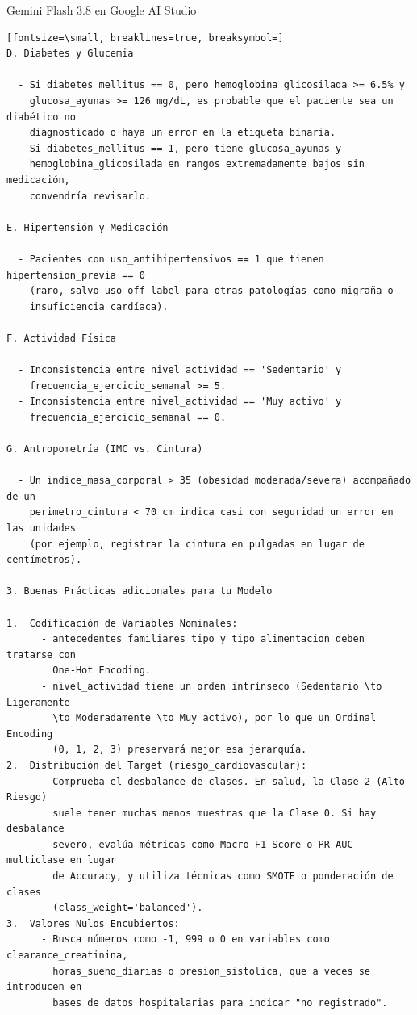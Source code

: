 \documentclass[12pt,a4paper,oneside]{book}
\begin{document}
\begin{iaresp}{Gemini Flash 3.8 en Google AI Studio}
\begin{Verbatim}[fontsize=\small, breaklines=true, breaksymbol=]
D. Diabetes y Glucemia

  - Si diabetes_mellitus == 0, pero hemoglobina_glicosilada >= 6.5% y
    glucosa_ayunas >= 126 mg/dL, es probable que el paciente sea un diabético no
    diagnosticado o haya un error en la etiqueta binaria.
  - Si diabetes_mellitus == 1, pero tiene glucosa_ayunas y
    hemoglobina_glicosilada en rangos extremadamente bajos sin medicación,
    convendría revisarlo.

E. Hipertensión y Medicación

  - Pacientes con uso_antihipertensivos == 1 que tienen hipertension_previa == 0
    (raro, salvo uso off-label para otras patologías como migraña o
    insuficiencia cardíaca).

F. Actividad Física

  - Inconsistencia entre nivel_actividad == 'Sedentario' y
    frecuencia_ejercicio_semanal >= 5.
  - Inconsistencia entre nivel_actividad == 'Muy activo' y
    frecuencia_ejercicio_semanal == 0.

G. Antropometría (IMC vs. Cintura)

  - Un indice_masa_corporal > 35 (obesidad moderada/severa) acompañado de un
    perimetro_cintura < 70 cm indica casi con seguridad un error en las unidades
    (por ejemplo, registrar la cintura en pulgadas en lugar de centímetros).

3. Buenas Prácticas adicionales para tu Modelo

1.  Codificación de Variables Nominales:
      - antecedentes_familiares_tipo y tipo_alimentacion deben tratarse con
        One-Hot Encoding.
      - nivel_actividad tiene un orden intrínseco (Sedentario \to Ligeramente
        \to Moderadamente \to Muy activo), por lo que un Ordinal Encoding
        (0, 1, 2, 3) preservará mejor esa jerarquía.
2.  Distribución del Target (riesgo_cardiovascular):
      - Comprueba el desbalance de clases. En salud, la Clase 2 (Alto Riesgo)
        suele tener muchas menos muestras que la Clase 0. Si hay desbalance
        severo, evalúa métricas como Macro F1-Score o PR-AUC multiclase en lugar
        de Accuracy, y utiliza técnicas como SMOTE o ponderación de clases
        (class_weight='balanced').
3.  Valores Nulos Encubiertos:
      - Busca números como -1, 999 o 0 en variables como clearance_creatinina,
        horas_sueno_diarias o presion_sistolica, que a veces se introducen en
        bases de datos hospitalarias para indicar "no registrado".
\end{Verbatim}
\end{iaresp}
\end{document}
